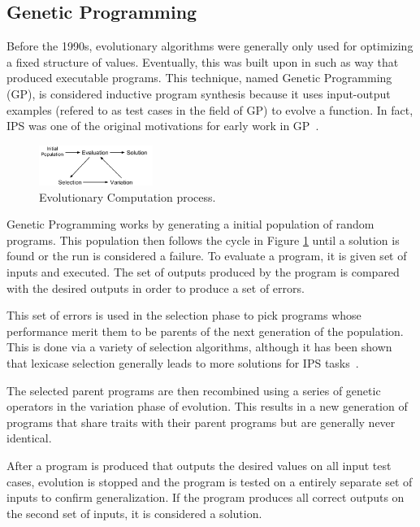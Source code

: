 \subsection{Genetic Programming}

Before the 1990s, evolutionary algorithms were generally only used for optimizing a fixed structure of values. Eventually, this was built upon in such as way that produced executable programs. This technique, named Genetic Programming (GP), is considered inductive program synthesis because it uses input-output examples (refered to as test cases in the field of GP) to evolve a function. In fact, IPS was one of the original motivations for early work in GP~\cite{Koza1992}.
\begin{figure}[t]
\centering
\includegraphics[width=0.33\textwidth]{res/EvolutionCycle}
\caption{Evolutionary Computation process.}
\label{fig:evo}
\end{figure}
Genetic Programming works by generating a initial population of random programs.  This population then follows the cycle in Figure \ref{fig:evo} until a solution is found or the run is considered a failure. To evaluate a program, it is given set of inputs and executed. The set of outputs produced by the program is compared with the desired outputs in order to produce a set of errors.

This set of errors is used in the selection phase to pick programs whose performance merit them to be parents of the next generation of the population. This is done via a variety of selection algorithms, although it has been shown that lexicase selection generally leads to more solutions for IPS tasks~\cite{Helmuth2015a, Helmuth2015c, Forstenlechner:2017:eurogp}.

The selected parent programs are then recombined using a series of genetic operators in the variation phase of evolution. This results in a new generation of programs that share traits with their parent programs but are generally never identical.

After a program is produced that outputs the desired values on all input test cases, evolution is stopped and the program is tested on a entirely separate set of inputs to confirm generalization. If the program produces all correct outputs on the second set of inputs, it is considered a solution.

